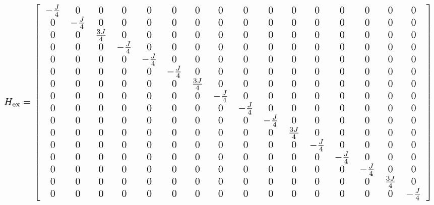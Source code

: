 \documentclass[a4paper,landscape]{article}
\begin{document}
\small
\[\scalebox{1.5}{%
    $
    H_{\mathrm{ex}} = \left[\begin{array}{cccccccccccccccc}- \frac{J}{4} & 0 & 0 & 0 & 0 & 0 & 0 & 0 & 0 & 0 & 0 & 0 & 0 & 0 & 0 & 0\\0 & - \frac{J}{4} & 0 & 0 & 0 & 0 & 0 & 0 & 0 & 0 & 0 & 0 & 0 & 0 & 0 & 0\\0 & 0 & \frac{3 J}{4} & 0 & 0 & 0 & 0 & 0 & 0 & 0 & 0 & 0 & 0 & 0 & 0 & 0\\0 & 0 & 0 & - \frac{J}{4} & 0 & 0 & 0 & 0 & 0 & 0 & 0 & 0 & 0 & 0 & 0 & 0\\0 & 0 & 0 & 0 & - \frac{J}{4} & 0 & 0 & 0 & 0 & 0 & 0 & 0 & 0 & 0 & 0 & 0\\0 & 0 & 0 & 0 & 0 & - \frac{J}{4} & 0 & 0 & 0 & 0 & 0 & 0 & 0 & 0 & 0 & 0\\0 & 0 & 0 & 0 & 0 & 0 & \frac{3 J}{4} & 0 & 0 & 0 & 0 & 0 & 0 & 0 & 0 & 0\\0 & 0 & 0 & 0 & 0 & 0 & 0 & - \frac{J}{4} & 0 & 0 & 0 & 0 & 0 & 0 & 0 & 0\\0 & 0 & 0 & 0 & 0 & 0 & 0 & 0 & - \frac{J}{4} & 0 & 0 & 0 & 0 & 0 & 0 & 0\\0 & 0 & 0 & 0 & 0 & 0 & 0 & 0 & 0 & - \frac{J}{4} & 0 & 0 & 0 & 0 & 0 & 0\\0 & 0 & 0 & 0 & 0 & 0 & 0 & 0 & 0 & 0 & \frac{3 J}{4} & 0 & 0 & 0 & 0 & 0\\0 & 0 & 0 & 0 & 0 & 0 & 0 & 0 & 0 & 0 & 0 & - \frac{J}{4} & 0 & 0 & 0 & 0\\0 & 0 & 0 & 0 & 0 & 0 & 0 & 0 & 0 & 0 & 0 & 0 & - \frac{J}{4} & 0 & 0 & 0\\0 & 0 & 0 & 0 & 0 & 0 & 0 & 0 & 0 & 0 & 0 & 0 & 0 & - \frac{J}{4} & 0 & 0\\0 & 0 & 0 & 0 & 0 & 0 & 0 & 0 & 0 & 0 & 0 & 0 & 0 & 0 & \frac{3 J}{4} & 0\\0 & 0 & 0 & 0 & 0 & 0 & 0 & 0 & 0 & 0 & 0 & 0 & 0 & 0 & 0 & - \frac{J}{4}\end{array}\right]
    $
}\]
\end{document}
